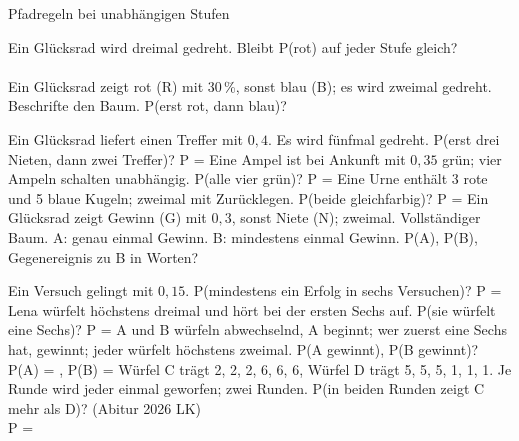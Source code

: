 \setcounter{aufgabe}{16}

\begin{aufgabe}{Pfadregeln bei unabhängigen Stufen}
\begin{teile}
\teil Ein Glücksrad wird dreimal gedreht. Bleibt P(rot) auf jeder Stufe gleich?\\ \\ 
\teil Ein Glücksrad zeigt rot (R) mit 30\,\%, sonst blau (B); es wird zweimal gedreht. Beschrifte den Baum. P(erst rot, dann blau)?

\teil Ein Glücksrad liefert einen Treffer mit $0{,}4$. Es wird fünfmal gedreht. P(erst drei Nieten, dann zwei Treffer)? P = \leerfeld
\teil Eine Ampel ist bei Ankunft mit $0{,}35$ grün; vier Ampeln schalten unabhängig. P(alle vier grün)? P = \leerfeld
\teil Eine Urne enthält 3 rote und 5 blaue Kugeln; zweimal mit Zurücklegen. P(beide gleichfarbig)? P = \leerfeld
\teil Ein Glücksrad zeigt Gewinn (G) mit $0{,}3$, sonst Niete (N); zweimal. Vollständiger Baum. A: genau einmal Gewinn. B: mindestens einmal Gewinn. P(A), P(B), Gegenereignis zu B in Worten?

\teil Ein Versuch gelingt mit $0{,}15$. P(mindestens ein Erfolg in sechs Versuchen)? P = \leerfeld
\teil Lena würfelt höchstens dreimal und hört bei der ersten Sechs auf. P(sie würfelt eine Sechs)? P = \leerfeld
\teil A und B würfeln abwechselnd, A beginnt; wer zuerst eine Sechs hat, gewinnt; jeder würfelt höchstens zweimal. P(A gewinnt), P(B gewinnt)? P(A) = \leerfeld, P(B) = \leerfeld
\teil Würfel C trägt 2, 2, 2, 6, 6, 6, Würfel D trägt 5, 5, 5, 1, 1, 1. Je Runde wird jeder einmal geworfen; zwei Runden. P(in beiden Runden zeigt C mehr als D)? \hfill (Abitur 2026 LK) \\ P = \leerfeld
\end{teile}
\end{aufgabe}

